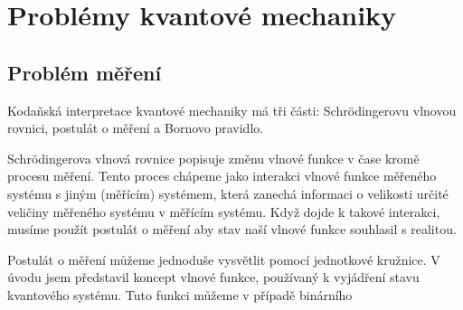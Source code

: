 \section{Problémy kvantové mechaniky}
    \subsection{Problém měření}
Kodaňská interpretace kvantové mechaniky má tři části: Schrödingerovu vlnovou rovnici, postulát o měření a Bornovo pravidlo.

Schrödingerova vlnová rovnice popisuje změnu vlnové funkce v čase kromě procesu měření. Tento proces chápeme jako interakci vlnové funkce měřeného systému s jiným (měřícím) systé\-mem, která zanechá informaci o velikosti určité veličiny měřeného systému v měřícím systému. Když dojde k takové interakci, musíme použít postulát o měření aby stav naší vlnové funkce souhlasil s realitou.

Postulát o měření můžeme jednoduše vysvětlit pomocí jednotkové kružnice. V úvodu jsem představil koncept vlnové funkce, používaný k vyjádření stavu kvantového systému. Tuto funkci můžeme v případě binárního 



\begin{figure}[h]

    \centering

    \caption{\label{fig:3}}
\end{figure}